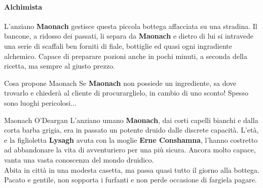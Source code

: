 \documentclass[10pt,twoside,onecolumn,openany]{book}
\begin{document}
\begin{multicols}{2}
\paragraph{Alchimista} L'anziano \textbf{Maonach} gestisce questa piccola bottega affacciata su una stradina. Il bancone, a ridosso dei passati, li separa da \textbf{Maonach} e dietro di lui si intravede una serie di scaffali ben forniti di fiale, bottiglie ed quasi ogni ingradiente alchemico. Capace di preparare pozioni anche in pochi minuti, a seconda della ricetta, ma sempre al giusto prezzo.
\begin{commentbox}{{Cosa propone Maonach}}
Se \textbf{Maonach} non possiede un ingrediente, sa dove trovarlo e chiederà al cliente di procurarglielo, in cambio di uno sconto! Spesso sono luoghi pericolosi...
\end{commentbox}
\columnbreak
\begin{paperbox}{{Maonach O'Deargan}}
L'anziano umano \textbf{Maonach}, dai corti capelli bianchi e dalla corta barba grigia, era in passato un potente druido dalle discrete capacità. L'età, e la figlioletta \textbf{Lysagh} avuta con la moglie \textbf{Erne Conshamna}, l'hanno costretto ad abbandonare la vita di avventuriero per una più sicura. Ancora molto capace, vanta una vasta conoscenza del mondo druidico.\\
Abita in città in una modesta casetta, ma passa quasi tutto il giorno alla bottega. Pacato e gentile, non sopporta i furfanti e non perde occasione di fargiela pagare.
\end{paperbox}
\end{multicols}
\end{document}
